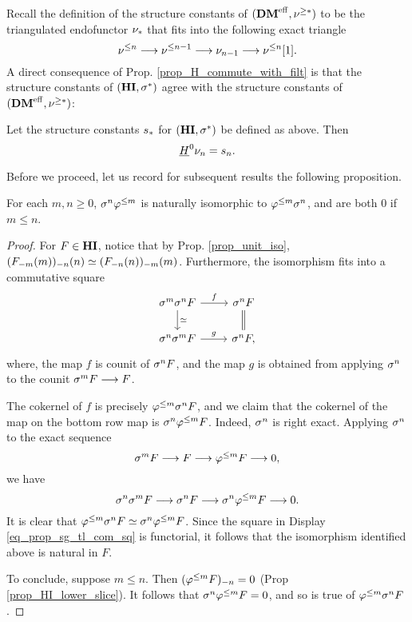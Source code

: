 Recall the definition of the structure constants of $(\DMeff, 
\sgDM{*})$ to be the triangulated endofunctor $\sliceDM{*}$ that
fits into the following exact triangle
\[
\slDM{n} \to \slDM{n - 1} \to \sliceDM{n - 1} \to \slDM{n}[1].
\]
A direct consequence of Prop. \ref{prop_H_commute_with_filt} is 
that the structure constants of $(\HI, \sgHI{*})$ agree with the 
structure constants of $(\DMeff, \sgDM{*})$:

\begin{cor}\label{cor_H_commute_with_slice}
Let the structure constants $\slice{*}$ for $(\HI, \sgHI{*})$ be 
defined as above. Then
\[
\sheaf{H}^0 \sliceDM{n} = \slice{n}.
\]
\end{cor}

Before we proceed, let us record for subsequent results the 
following proposition.

\begin{prop}\label{prop_sg_tl_commuute}
For each $m, n \geq 0$, $\sgHI{n} \tlHI{m}$ is naturally
isomorphic to $\tlHI{m} \sgHI{n}$, and are both 0 if $m \leq n$.
\end{prop}
\begin{proof}
For $F \in \HI$, notice that by Prop. \ref{prop_unit_iso}, 
$\LHI[n]{\RHI[n]{(\LHI[m]{\RHI[m]{F}})}} \simeq
\LHI[m]{\RHI[m]{(\LHI[n]{\RHI[n]{F}})}}$. Furthermore, the 
isomorphism fits into a commutative square
\begin{equation}\label{eq_prop_sg_tl_com_sq}
\begin{tikzcd}
\sgHI{m}\sgHI{n} F \arrow{r}{f} \arrow{d}{\simeq} & 
\sgHI{n} F \arrow[equal]{d} \\
\sgHI{n}\sgHI{m} F \arrow{r}{g} &
\sgHI{n} F,
\end{tikzcd}
\end{equation}
where, the map $f$ is counit of $\sgHI{n} F$, and the map $g$
is obtained from applying $\sgHI{n}$ to the counit $\sgHI{m} F 
\to F$.

The cokernel of $f$ is precisely $\tlHI{m} \sgHI{n} F$, and we 
claim that the cokernel of the map on the bottom row map is 
$\sgHI{n} \tlHI{m} F$. Indeed, $\sgHI{n}$ is right exact. Applying 
$\sgHI{n}$ to the exact sequence
\[
\sgHI{m} F \to F \to \tlHI{m} F \to 0,
\]
we have
\[
\sgHI{n} \sgHI{m} F \to \sgHI{n} F \to \sgHI{n} \tlHI{m} F \to 0.
\]
It is clear that $\tlHI{m} \sgHI{n} F \simeq \sgHI{n} \tlHI{m} F$.
Since the square in Display \ref{eq_prop_sg_tl_com_sq} is 
functorial, it follows that the isomorphism identified above is
natural in $F$.

To conclude, suppose $m \leq n$. Then $\RHI[n]{(\tlHI{m} F)} = 0$
(Prop \ref{prop_HI_lower_slice}). It follows that $\sgHI{n} 
\tlHI{m} F = 0$, and so is true of $\tlHI{m} \sgHI{n} F$.
\end{proof}

